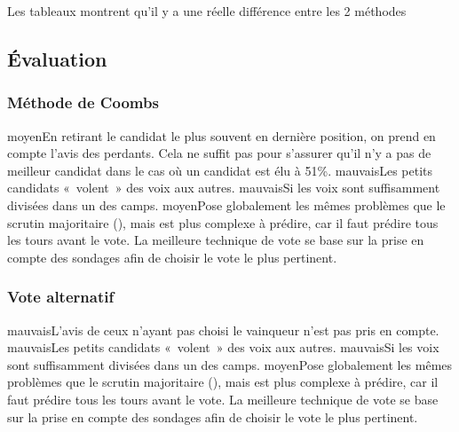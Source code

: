 \documentclass[../report]{subfiles}
\begin{document}
  Les tableaux  montrent qu'il y a une réelle différence entre les 2 méthodes

  \subsection{Évaluation}
  \subsubsection{Méthode de Coombs}
  \tabcritere%
    {moyen}{En retirant le candidat le plus souvent en dernière position, on prend en compte l'avis des perdants. Cela ne suffit pas pour s'assurer qu'il n'y a pas de meilleur candidat dans le cas où un candidat est élu à 51\%.}%
    {mauvais}{Les petits candidats «~volent~» des voix aux autres.}%
    {mauvais}{Si les voix sont suffisamment divisées dans un des camps.}%
    {moyen}{Pose globalement les mêmes problèmes que le scrutin majoritaire (), mais est plus complexe à prédire, car il faut prédire tous les tours avant le vote. La meilleure technique de vote se base sur la prise en compte des sondages afin de choisir le vote le plus pertinent.}
  \subsubsection{Vote alternatif}
  \tabcritere%
    {mauvais}{L'avis de ceux n'ayant pas choisi le vainqueur n'est pas pris en compte.}%
    {mauvais}{Les petits candidats «~volent~» des voix aux autres.}%
    {mauvais}{Si les voix sont suffisamment divisées dans un des camps.}%
    {moyen}{Pose globalement les mêmes problèmes que le scrutin majoritaire (), mais est plus complexe à prédire, car il faut prédire tous les tours avant le vote. La meilleure technique de vote se base sur la prise en compte des sondages afin de choisir le vote le plus pertinent.}


  
\end{document}
